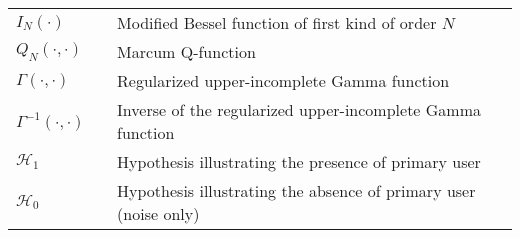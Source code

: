 \begin{longtable}{p{}p{}p{}}
       $I_{N}(\cdot)$	        & &	Modified Bessel function of first kind of order $N$ \\		
       $Q_{N}(\cdot, \cdot)$	& &	Marcum Q-function \\		
       $\Gamma(\cdot, \cdot)$	& &	Regularized upper-incomplete Gamma function\\		
       $\Gamma^{-1}(\cdot, \cdot)$	& &	Inverse of the regularized upper-incomplete Gamma function\\		
       $\mathcal H_1$			& &	Hypothesis illustrating the presence of primary user\\	
       $\mathcal H_0$			& &	Hypothesis illustrating the absence of primary user (noise only) \\		
\end{longtable}
  




